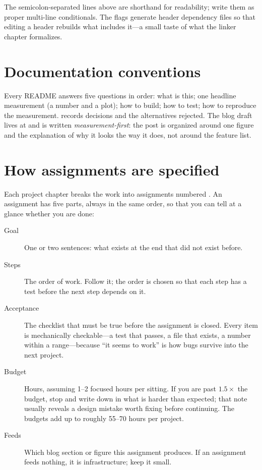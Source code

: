 The semicolon-separated  lines above are shorthand for readability; write them as proper multi-line conditionals. The  flags generate header dependency files so that editing a header rebuilds what includes it---a small taste of what the linker chapter formalizes.

\section{Documentation conventions}

Every README answers five questions in order: what is this; one headline measurement (a number and a plot); how to build; how to test; how to reproduce the measurement.  records decisions and the alternatives rejected. The blog draft lives at  and is written \emph{measurement-first}: the post is organized around one figure and the explanation of why it looks the way it does, not around the feature list.

\section{How assignments are specified}
\label{sec:assignments}

Each project chapter breaks the work into assignments numbered . An assignment has five parts, always in the same order, so that you can tell at a glance whether you are done:

\begin{description}
  \item[Goal] One or two sentences: what exists at the end that did not exist before.
  \item[Steps] The order of work. Follow it; the order is chosen so that each step has a test before the next step depends on it.
  \item[Acceptance] The checklist that must be true before the assignment is closed. Every item is mechanically checkable---a test that passes, a file that exists, a number within a range---because ``it seems to work'' is how bugs survive into the next project.
  \item[Budget] Hours, assuming 1--2 focused hours per sitting. If you are past $1.5\times$ the budget, stop and write down in  what is harder than expected; that note usually reveals a design mistake worth fixing before continuing. The budgets add up to roughly 55--70 hours per project.
  \item[Feeds] Which blog section or figure this assignment produces. If an assignment feeds nothing, it is infrastructure; keep it small.
\end{description}

